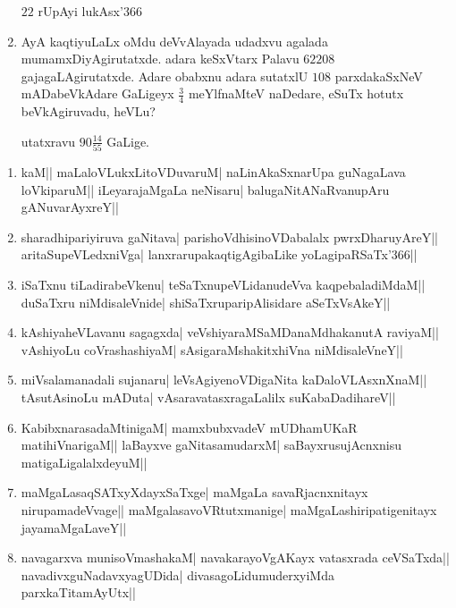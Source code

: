 \begin{enumerate}
\hfill $22$ rUpAyi lukAsx\char'366

\item AyA kaqtiyuLaLx oMdu deVvAlayada udadxvu agalada
mumamxDiyAgirutatxde. adara keSxVtarx Palavu $62208$
gajagaLAgirutatxde. Adare obabxnu adara sutatxlU $108$ parxdakaSxNeV
mADabeVkAdare GaLigeyx $\frac{3}{4}$ meYlfnaMteV naDedare, eSuTx
hotutx beVkAgiruvadu, heVLu?

\hfill utatxravu $90 \frac{14}{55}$ GaLige.
\end{enumerate}

\begin{enumerate}[\bf $(1)$]
\item 
\beginpoem
kaM|| maLaloVLukxLitoVDuvaruM| 
naLinAkaSxnarUpa guNagaLava loVkiparuM|| 
iLeyarajaMgaLa neNisaru|  
balugaNitANaRvanupAru gANuvarAyxreY||
\endpoem

\item 
\beginpoem
sharadhipariyiruva gaNitava| 
parishoVdhisinoVDabalalx pwrxDharuyAreY||
aritaSupeVLedxniVga|
lanxrarupakaqtigAgibaLike yoLagipaRSaTx{\char'366}||
\endpoem

\item
\beginpoem
iSaTxnu tiLadirabeVkenu|
teSaTxnupeVLidanudeVva kaqpebaladiMdaM||
duSaTxru niMdisaleVnide|
shiSaTxruparipAlisidare aSeTxVsAkeY||
\endpoem

\item 
\beginpoem
kAshiyaheVLavanu sagagxda|
veVshiyaraMSaMDanaMdhakanutA raviyaM||
vAshiyoLu coVrashashiyaM|
sAsigaraMshakitxhiVna niMdisaleVneY||
\endpoem

\item 
\beginpoem
miVsalamanadali sujanaru|
leVsAgiyenoVDigaNita kaDaloVLAsxnXnaM||
tAsutAsinoLu mADuta|
vAsaravatasxragaLalilx suKabaDadihareV||
\endpoem

\item 
\beginpoem
KabibxnarasadaMtinigaM|
mamxbubxvadeV mUDhamUKaR matihiVnarigaM||
laBayxve gaNitasamudarxM| 
saBayxrusujAcnxnisu matigaLigalalxdeyuM||
\endpoem

\item 
\beginpoem
maMgaLasaqSATxyXdayxSaTxge|
maMgaLa savaRjacnxnitayx nirupamadeVvage||
maMgalasavoVRtutxmanige|
maMgaLashiripatigenitayx jayamaMgaLaveY||
\endpoem

\item
\beginpoem
navagarxva munisoVmashakaM|
navakarayoVgAKayx vatasxrada ceVSaTxda||
navadivxguNadavxyagUDida|
divasagoLidumuderxyiMda parxkaTitamAyUtx||
\endpoem
\end{enumerate}

